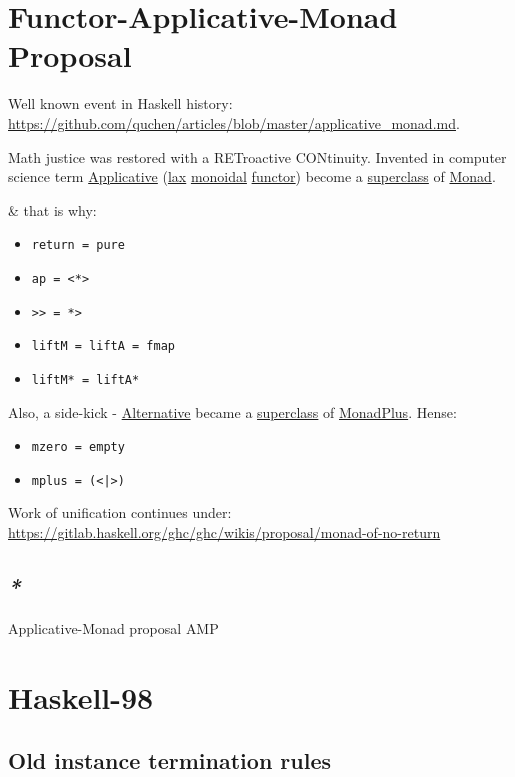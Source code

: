 \documentclass[a4paper,14pt,oneside]{book}
\begin{document}
\chapter{\label{orgc031dfa}Functor-Applicative-Monad Proposal}
\label{sec:org1cb4b12}
Well known event in Haskell history: \url{https://github.com/quchen/articles/blob/master/applicative\_monad.md}.

Math justice was restored with a RETroactive CONtinuity. Invented in computer science term \hyperref[orgceedd55]{Applicative} (\hyperref[orgdaad5fd]{lax} \hyperref[orgf8d4d86]{monoidal} \hyperref[org2393026]{functor}) become a \hyperref[org8d066cc]{superclass} of \hyperref[org54d7b7f]{Monad}.

\& that is why:
\begin{itemize}
\item \texttt{return = pure}
\item \texttt{ap = <*>}
\item \texttt{>> = *>}
\item \texttt{liftM = liftA = fmap}
\item \texttt{liftM* = liftA*}
\end{itemize}

Also, a side-kick - \hyperref[org46da0ee]{Alternative} became a \hyperref[org8d066cc]{superclass} of \hyperref[orgd6e3254]{MonadPlus}. Hense:
\begin{itemize}
\item \texttt{mzero = empty}
\item \texttt{mplus = (<|>)}
\end{itemize}

Work of unification continues under: \url{https://gitlab.haskell.org/ghc/ghc/wikis/proposal/monad-of-no-return}

\section{\emph{*}}
\label{sec:orgd440578}

\label{org065b789}Applicative-Monad proposal
\label{org010d7f0}AMP

\chapter{Haskell-98}
\label{sec:orge82257d}

\section{\label{orgcc8cb1a}Old instance termination rules}
\label{sec:orgd884944}
\end{document}
